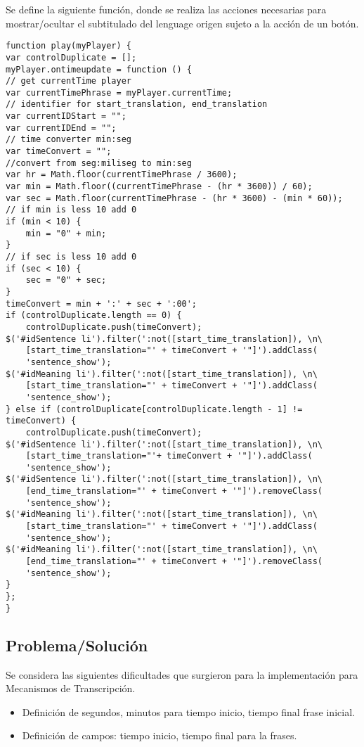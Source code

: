 Se define la siguiente funci\'{o}n, donde se realiza las acciones necesarias para
mostrar/ocultar el subtitulado del lenguage origen sujeto a la acci\'{o}n de un 
bot\'{o}n.  

\begin{lstlisting}[]
function play(myPlayer) {
var controlDuplicate = [];
myPlayer.ontimeupdate = function () {
// get currentTime player
var currentTimePhrase = myPlayer.currentTime;
// identifier for start_translation, end_translation
var currentIDStart = "";
var currentIDEnd = "";
// time converter min:seg
var timeConvert = "";
//convert from seg:miliseg to min:seg
var hr = Math.floor(currentTimePhrase / 3600);
var min = Math.floor((currentTimePhrase - (hr * 3600)) / 60);
var sec = Math.floor(currentTimePhrase - (hr * 3600) - (min * 60));
// if min is less 10 add 0
if (min < 10) {
    min = "0" + min;
}
// if sec is less 10 add 0
if (sec < 10) {
    sec = "0" + sec;
}
timeConvert = min + ':' + sec + ':00';
if (controlDuplicate.length == 0) {
    controlDuplicate.push(timeConvert);
$('#idSentence li').filter(':not([start_time_translation]), \n\
    [start_time_translation="' + timeConvert + '"]').addClass(
    'sentence_show');
$('#idMeaning li').filter(':not([start_time_translation]), \n\
    [start_time_translation="' + timeConvert + '"]').addClass(
    'sentence_show');
} else if (controlDuplicate[controlDuplicate.length - 1] != timeConvert) {
    controlDuplicate.push(timeConvert);
$('#idSentence li').filter(':not([start_time_translation]), \n\
    [start_time_translation="'+ timeConvert + '"]').addClass(
    'sentence_show');
$('#idSentence li').filter(':not([start_time_translation]), \n\
    [end_time_translation="' + timeConvert + '"]').removeClass(
    'sentence_show');
$('#idMeaning li').filter(':not([start_time_translation]), \n\
    [start_time_translation="' + timeConvert + '"]').addClass(
    'sentence_show');
$('#idMeaning li').filter(':not([start_time_translation]), \n\
    [end_time_translation="' + timeConvert + '"]').removeClass(
    'sentence_show');
}
};
}       
\end{lstlisting}

\subsection{Problema/Soluci\'{o}n}

Se considera las siguientes dificultades que surgieron para la implementaci\'{o}n
para Mecanismos de Transcripci\'{o}n.

\begin{itemize}

\item Definici\'{o}n de segundos, minutos para tiempo inicio, tiempo final frase inicial.
\item Definici\'{o}n de campos: tiempo inicio, tiempo final para la frases.

\end{itemize}

